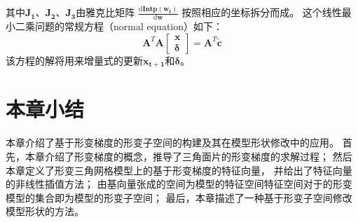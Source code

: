 其中$\bm{J_1}$、$\bm{J_2}$、$\bm{J_3}$由雅克比矩阵
$\frac
    {\mathrm{d} \bm{Intp}(\bm{w_t})}
    {\mathrm{d} \bm{w}}
$
按照相应的坐标拆分而成。
这个线性最小二乘问题的常规方程（normal equation）如下： 
\begin{equation}
    \bm{A}^T\bm{A}
    \begin{bmatrix}
        \bm{x}\\
        \bm{\delta}
    \end{bmatrix}
    =
    \bm{A}^T\widetilde{\bm{c}}
\end{equation}
该方程的解将用来增量式的更新$\bm{x_{t+1}}$和$\bm{\delta}$。
\section{本章小结}

本章介绍了基于形变梯度的形变子空间的构建及其在模型形状修改中的应用。
首先，本章介绍了形变梯度的概念，推导了三角面片的形变梯度的求解过程；
然后本章定义了形变三角网格模型上的基于形变梯度的特征向量，
并给出了特征向量的非线性插值方法；
由基向量张成的空间为模型的特征空间特征空间对于的形变模型的集合即为模型的形变子空间；
最后，本章描述了一种基于形变子空间修改模型形状的方法。